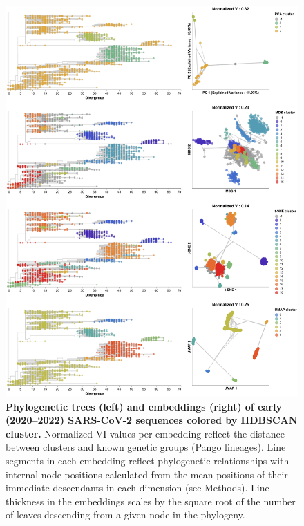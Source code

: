 \begin{figure}[!h]
\includegraphics[width=\columnwidth]{figures/sarscov2-embeddings-by-cluster-vs-Nextclade_pango_collapsed.png}
\caption{{\bf Phylogenetic trees (left) and embeddings (right) of early (2020--2022) SARS-CoV-2 sequences colored by HDBSCAN cluster.}
  Normalized VI values per embedding reflect the distance between clusters and known genetic groups (Pango lineages).
  Line segments in each embedding reflect phylogenetic relationships with internal node positions calculated from the mean positions of their immediate descendants in each dimension (see Methods).
  Line thickness in the embeddings scales by the square root of the number of leaves descending from a given node in the phylogeny.
}\label{S_Fig_sarscov2_early_embeddings_by_cluster_vs_Nextclade_pango}
\end{figure}


